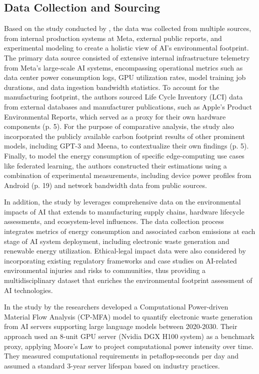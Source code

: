\documentclass[a4paper, 12pt]{article}
\begin{document}
\subsection{Data Collection and Sourcing}
Based on the study conducted by \citet{Wu2022}, the data was collected from multiple sources, from internal production systems at Meta, external public reports, and experimental modeling to create a holistic view of AI's environmental footprint. The primary data source consisted of extensive internal infrastructure telemetry from Meta's large-scale AI systems, encompassing operational metrics such as data center power consumption logs, GPU utilization rates, model training job durations, and data ingestion bandwidth statistics. To account for the manufacturing footprint, the authors sourced Life Cycle Inventory (LCI) data from external databases and manufacturer publications, such as Apple's Product Environmental Reports, which served as a proxy for their own hardware components (p. 5). For the purpose of comparative analysis, the study also incorporated the publicly available carbon footprint results of other prominent models, including GPT-3 and Meena, to contextualize their own findings (p. 5). Finally, to model the energy consumption of specific edge-computing use cases like federated learning, the authors constructed their estimations using a combination of experimental measurements, including device power profiles from Android (p. 19) and network bandwidth data from public sources.\hfill \break

In addition, the study by \citet{Zhuk2023} leverages comprehensive data on the environmental impacts of AI that extends to manufacturing supply chains, hardware lifecycle assessments, and ecosystem-level influences. The data collection process integrates metrics of energy consumption and associated carbon emissions at each stage of AI system deployment, including electronic waste generation and renewable energy utilization. Ethical-legal impact data were also considered by incorporating existing regulatory frameworks and case studies on AI-related environmental injuries and risks to communities, thus providing a multidisciplinary dataset that enriches the environmental footprint assessment of AI technologies.\hfill \break

In the study by \citet{wang_2024_ewaste} the researchers developed a Computational Power-driven Material Flow Analysis (CP-MFA) model to quantify electronic waste generation from AI servers supporting large language models between 2020-2030. Their approach used an 8-unit GPU server (Nvidia DGX H100 system) as a benchmark proxy, applying Moore's Law to project computational power intensity over time. They measured computational requirements in petaflop-seconds per day and assumed a standard 3-year server lifespan based on industry practices.\hfill \break
\end{document}
